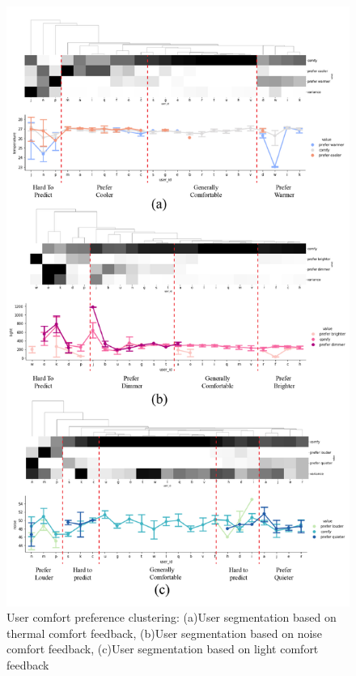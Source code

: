 \documentclass[]{interact}
\theoremstyle{plain}%
\theoremstyle{definition}
\theoremstyle{remark}
\begin{document}
\begin{figure}
\centering
\includegraphics[scale=0.8]{figures/results-01.jpg}
\caption{User comfort preference clustering: (a)User segmentation based on thermal comfort feedback, (b)User segmentation based on noise comfort feedback, (c)User segmentation based on light comfort feedback} 
\label{clustering}
\end{figure}

\end{document}
